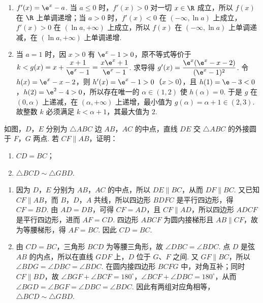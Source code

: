 \begin{solution}
\begin{enumerate}
\item \(f'(x)=\e^x-a\). 当 \(a\leqslant0\) 时，\(f'(x)>0\) 对一切 \(x\in\R\) 成立，所以 \(f(x)\) 在 \(\R\) 上单调递增；当 \(a>0\) 时，\(f'(x)<0\) 在 \((-\infty,\ln a)\) 上成立，\(f'(x)>0\) 在 \((\ln a,+\infty)\) 上成立，所以 \(f(x)\) 在 \((-\infty,\ln a)\) 上单调递减，在 \((\ln a,+\infty)\) 上单调递增.
\item 当 \(a=1\) 时，因 \(x>0\) 有 \(\e^x-1>0\)，原不等式等价于
\(k<g(x)=x+\dfrac{x+1}{\e^x-1}=\dfrac{x\e^x+1}{\e^x-1}\). 求导得 \(g'(x)=\dfrac{\e^x(\e^x-x-2)}{(\e^x-1)^2}\). 令 \(h(x)=\e^x-x-2\)，则 \(h'(x)=\e^x-1>0\)（\(x>0\)），且 \(h(1)=\e-3<0\)，\(h(2)=\e^2-4>0\)，所以存在唯一的 \(\alpha\in(1,2)\) 使 \(h(\alpha)=0\). 于是 \(g\) 在 \((0,\alpha)\) 上递减，在 \((\alpha,+\infty)\) 上递增，最小值为 \(g(\alpha)=\alpha+1\in(2,3)\). 故整数 \(k\) 必须满足 \(k<\alpha+1\)，其最大值为 \(2\).
\end{enumerate}
\end{solution}

\begin{problem}
如图，\(D\)，\(E\) 分别为 \(\triangle ABC\) 边 \(AB\)，\(AC\) 的中点，直线 \(DE\) 交 \(\triangle ABC\) 的外接圆于 \(F\)，\(G\) 两点. 若 \(CF\parallel AB\)，证明：

\begin{enumerate}
\item \(CD = BC\)；
\item \(\triangle BCD \sim \triangle GBD\).
\end{enumerate}

\end{problem}

\begin{solution}
\begin{enumerate}
\item 因为 \(D\)，\(E\) 分别为 \(AB\)，\(AC\) 的中点，所以 \(DE\parallel BC\)，从而 \(DF\parallel BC\). 又已知 \(CF\parallel AB\)，而 \(B\)，\(D\)，\(A\) 共线，所以四边形 \(BDFC\) 是平行四边形，得 \(CF=BD\). 由 \(AD=DB\)，可得 \(CF=AD\)，且 \(CF\parallel AD\)，所以四边形 \(ADCF\) 是平行四边形，进而 \(AF=CD\). 四边形 \(ABCF\) 为圆内接梯形且 \(AB\parallel CF\)，故为等腰梯形，得 \(AF=BC\). 因此 \(CD=BC\).
\item 由 \(CD=BC\)，三角形 \(BCD\) 为等腰三角形，故 \(\angle DBC=\angle BDC\). 点 \(D\) 是弦 \(AB\) 的内点，所以在直线 \(GDF\) 上，\(D\) 位于 \(G\)、\(F\) 之间. 又 \(GF\parallel BC\)，所以 \(\angle BDG=\angle DBC=\angle BDC\). 在圆内接四边形 \(BCFG\) 中，对角互补；同时 \(CF\parallel BD\)，故 \(\angle BGF+\angle BCF=180^{\circ}\)，\(\angle BCF+\angle DBC=180^{\circ}\)，从而 \(\angle BGD=\angle BGF=\angle DBC=\angle BDC\). 因此有两组对应角相等，\(\triangle BCD\sim\triangle GBD\).
\end{enumerate}
\end{solution}


